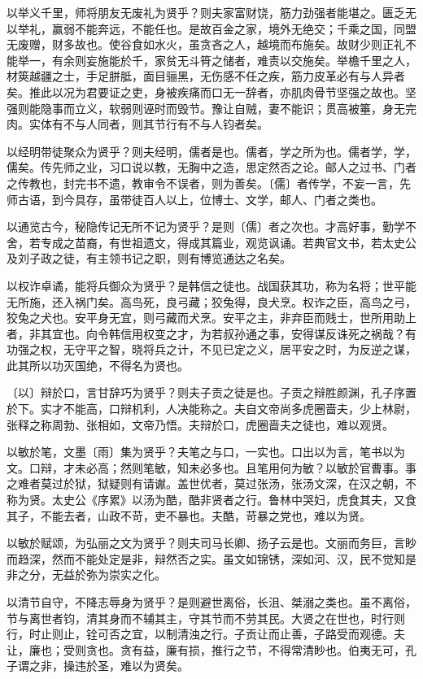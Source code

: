\documentclass[]{article}
\begin{document}
以举义千里，师将朋友无废礼为贤乎？则夫家富财饶，筋力劲强者能堪之。匮乏无以举礼，赢弱不能奔远，不能任也。是故百金之家，境外无绝交；千乘之国，同盟无废赠，财多故也。使谷食如水火，虽贪吝之人，越境而布施矣。故财少则正礼不能举一，有余则妄施能於千，家贫无斗筲之储者，难责以交施矣。举檐千里之人，材筴越疆之士，手足胼胝，面目骊黑，无伤感不任之疾，筋力皮革必有与人异者矣。推此以况为君要证之吏，身被疾痛而口无一辞者，亦肌肉骨节坚强之故也。坚强则能隐事而立义，软弱则诬时而毁节。豫让自贼，妻不能识；贯高被箠，身无完肉。实体有不与人同者，则其节行有不与人钧者矣。

以经明带徒聚众为贤乎？则夫经明，儒者是也。儒者，学之所为也。儒者学，学，儒矣。传先师之业，习口说以教，无胸中之造，思定然否之论。邮人之过书、门者之传教也，封完书不遗，教审令不误者，则为善矣。〔儒〕者传学，不妄一言，先师古语，到今具存，虽带徒百人以上，位博士、文学，邮人、门者之类也。

以通览古今，秘隐传记无所不记为贤乎？是则〔儒〕者之次也。才高好事，勤学不舍，若专成之苗裔，有世祖遗文，得成其篇业，观览讽诵。若典官文书，若太史公及刘子政之徒，有主领书记之职，则有博览通达之名矣。

以权诈卓谲，能将兵御众为贤乎？是韩信之徒也。战国获其功，称为名将；世平能无所施，还入祸门矣。高鸟死，良弓藏；狡兔得，良犬烹。权诈之臣，高鸟之弓，狡兔之犬也。安平身无宜，则弓藏而犬烹。安平之主，非弃臣而贱士，世所用助上者，非其宜也。向令韩信用权变之才，为若叔孙通之事，安得谋反诛死之祸哉？有功强之权，无守平之智，晓将兵之计，不见已定之义，居平安之时，为反逆之谋，此其所以功灭国绝，不得名为贤也。

〔以〕辩於口，言甘辞巧为贤乎？则夫子贡之徒是也。子贡之辩胜颜渊，孔子序置於下。实才不能高，口辩机利，人决能称之。夫自文帝尚多虎圈啬夫，少上林尉，张释之称周勃、张相如，文帝乃悟。夫辩於口，虎圈啬夫之徒也，难以观贤。

以敏於笔，文墨〔雨〕集为贤乎？夫笔之与口，一实也。口出以为言，笔书以为文。口辩，才未必高；然则笔敏，知未必多也。且笔用何为敏？以敏於官曹事。事之难者莫过於狱，狱疑则有请谳。盖世优者，莫过张汤，张汤文深，在汉之朝，不称为贤。太史公《序累》以汤为酷，酷非贤者之行。鲁林中哭妇，虎食其夫，又食其子，不能去者，山政不苛，吏不暴也。夫酷，苛暴之党也，难以为贤。

以敏於赋颂，为弘丽之文为贤乎？则夫司马长卿、扬子云是也。文丽而务巨，言眇而趋深，然而不能处定是非，辩然否之实。虽文如锦锈，深如河、汉，民不觉知是非之分，无益於弥为崇实之化。

以清节自守，不降志辱身为贤乎？是则避世离俗，长沮、桀溺之类也。虽不离俗，节与离世者钧，清其身而不辅其主，守其节而不劳其民。大贤之在世也，时行则行，时止则止，铨可否之宜，以制清浊之行。子贡让而止善，子路受而观德。夫让，廉也；受则贪也。贪有益，廉有损，推行之节，不得常清眇也。伯夷无可，孔子谓之非，操违於圣，难以为贤矣。
\end{document}
